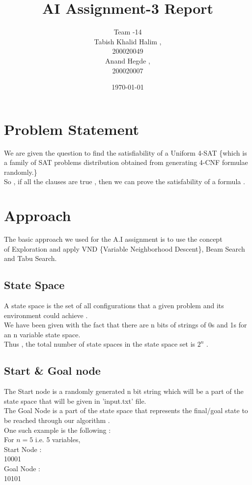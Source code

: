 \documentclass{article}
\title{AI Assignment-3 Report}
\date{\today}
\author{Team -14 \\Tabish Khalid Halim , \\ 200020049 \\ Anand Hegde , \\ 200020007}
\affil{Department of Computer Science, IIT Dharwad}
\begin{document}
\maketitle
{}
\newpage
\tableofcontents

\newpage
{}
\section{Problem Statement}
We are given the question to find the satisfiability of a Uniform 4-SAT \{which is a family of SAT problems distribution obtained from generating 4-CNF formulae randomly.\}
\\So , if all the clauses are true , then we can prove the satisfability of a formula .
\vspace{10pt}
\section{Approach}
The basic approach we used for the A.I assignment is to use the concept \\of Exploration and 
apply VND \{Variable Neighborhood Descent\}, Beam Search and Tabu Search.
\vspace{10pt}
\subsection*{State Space}
A state space is the set of all configurations that a given problem and its \\environment could achieve .
\vspace{10pt}
\\We have been given with the fact that there are n bits of strings of 0s and 1s for an n variable state space.
\\Thus , the total number of state spaces in the state space set is $2^n$ .
\subsection*{Start \& Goal node}
The Start node is a randomly generated n bit string which will be
a part of the state space that will be 
given in 'input.txt' file.
\\The Goal Node is a part of the state space that represents the final/goal state to be reached through
our algorithm .
\\One such example is the following :
\\For $n=5$ i.e. 5 variables,
\\Start Node :
\\10001
\\Goal Node :
\\10101
\newpage
\end{document}
